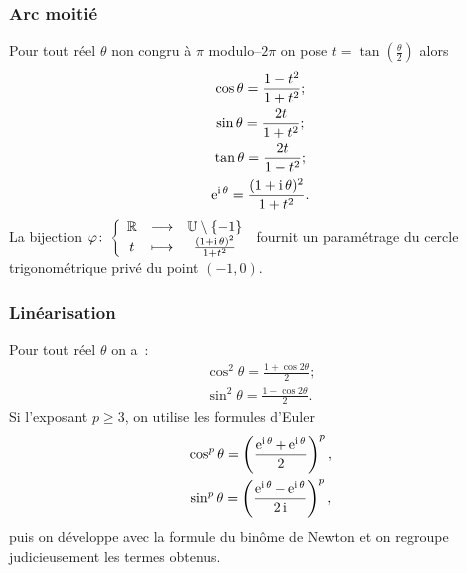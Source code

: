 \subsubsection{Arc moitié}
\label{subsubsec:arcmoitie}
Pour tout réel $\theta$ non congru à $\pi$ modulo--$2\pi$ on pose $t=\tan \left( \frac{\theta}{2} \right)$ alors
\begin{gather}
  \cos \theta = \dfrac{1-t^2}{1+t^2};\\
  \sin \theta = \dfrac{2t}{1+t^2}; \\
  \tan \theta = \frac{2t}{1-t^2};\\
  \operatorname{e}^{\operatorname{i} \theta}=\frac{(1+\operatorname{i} \theta)^2}{1+t^2}.
\end{gather}
La bijection $\varphi\colon \left\{\begin{array}{ccc} \mathbb{R} & \longrightarrow &\mathbb{U}\setminus \{-1\}\\ t & \longmapsto & \frac{(1+\operatorname{i} \theta)^2}{1+t^2} \end{array} \right.$ fournit un paramétrage du cercle trigonométrique privé du point $(-1,0)$.
%
\subsubsection{Linéarisation}
\label{subsubsec:linearisation}
Pour tout réel $\theta$ on a~:
\begin{gather}
  \cos^2 \theta = \frac{1+\cos 2\theta}{2}; \\
  \sin^2 \theta = \frac{1-\cos 2\theta}{2}.
\end{gather}
Si l'exposant $p \geq 3$, on utilise les formules d'Euler
\begin{gather}
  \cos^p \theta = \left(\frac{\operatorname{e}^{\operatorname{i} \theta}+\operatorname{e}^{\operatorname{i} \theta}}{2} \right)^p, \\
  \sin^p \theta = \left(\frac{\operatorname{e}^{\operatorname{i} \theta}-\operatorname{e}^{\operatorname{i} \theta}}{2 \operatorname{i}} \right)^p,
\end{gather}
puis on développe avec la formule du binôme de Newton et on regroupe judicieusement les termes obtenus.
%
